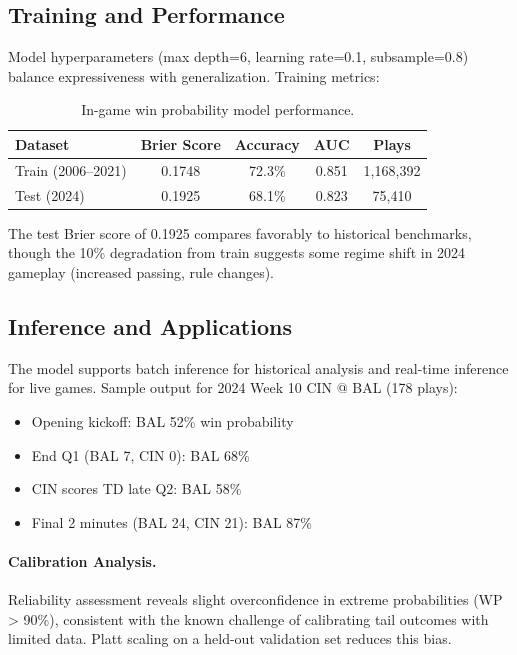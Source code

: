 \subsection{Training and Performance}

Model hyperparameters (max depth=6, learning rate=0.1, subsample=0.8) balance expressiveness with generalization. Training metrics:

\begin{table}[h]
\centering
\caption[In-game WP performance]{In-game win probability model performance.}
\label{tab:ingame-performance}
\begin{tabular}{lcccc}
\toprule
\textbf{Dataset} & \textbf{Brier Score} & \textbf{Accuracy} & \textbf{AUC} & \textbf{Plays} \\
\midrule
Train (2006--2021) & 0.1748 & 72.3\% & 0.851 & 1,168,392 \\
Test (2024) & 0.1925 & 68.1\% & 0.823 & 75,410 \\
\bottomrule
\end{tabular}
\end{table}

The test Brier score of 0.1925 compares favorably to historical benchmarks, though the 10\% degradation from train suggests some regime shift in 2024 gameplay (increased passing, rule changes).

\subsection{Inference and Applications}

The model supports batch inference for historical analysis and real-time inference for live games. Sample output for 2024 Week 10 CIN @ BAL (178 plays):

\begin{itemize}
\item Opening kickoff: BAL 52\% win probability
\item End Q1 (BAL 7, CIN 0): BAL 68\%
\item CIN scores TD late Q2: BAL 58\%
\item Final 2 minutes (BAL 24, CIN 21): BAL 87\%
\end{itemize}

\paragraph{Calibration Analysis.}
Reliability assessment reveals slight overconfidence in extreme probabilities (WP > 90\%), consistent with the known challenge of calibrating tail outcomes with limited data. Platt scaling on a held-out validation set reduces this bias.

